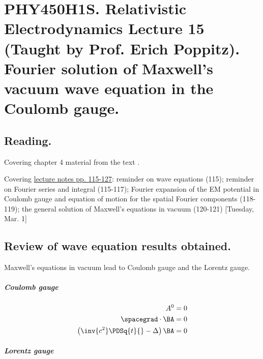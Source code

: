 
%

\chapter{PHY450H1S.  Relativistic Electrodynamics Lecture 15 (Taught by Prof. Erich Poppitz).  Fourier solution of Maxwell's vacuum wave equation in the Coulomb gauge.}
\label{chap:relativisticElectrodynamicsL15}
{}
\date{Mar 1, 2011}

\beginArtNoToc

\section{Reading.}

Covering chapter 4 material from the text \cite{landau1980classical}.

Covering \href{http://www.physics.utoronto.ca/~poppitz/e-poppitz/PHY450_files/RelEMpp115-127.pdf}{lecture notes pp. 115-127}: reminder on wave equations (115); reminder on Fourier series and integral (115-117); Fourier expansion of the EM potential in Coulomb gauge and equation of motion for the spatial Fourier components (118-119); the general solution of Maxwell's equations in vacuum (120-121) [Tuesday, Mar. 1]

\section{Review of wave equation results obtained.}

Maxwell's equations in vacuum lead to Coulomb gauge and the Lorentz gauge.

\paragraph{Coulomb gauge}

\begin{align}\label{eqn:relativisticElectrodynamicsL15:10}
A^0 &= 0 \\
\spacegrad \cdot \BA &= 0 \\
\left( \inv{c^2} \PDSq{t}{} - \Delta \right) \BA &= 0
\end{align}

\paragraph{Lorentz gauge}

